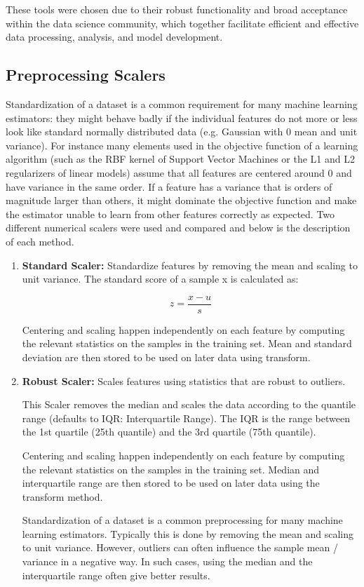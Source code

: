 \documentclass{article}
\theoremstyle{mytheoremstyle}
\theoremstyle{mytheoremstyle}
\theoremstyle{myproblemstyle}
\begin{document}
These tools were chosen due to their robust functionality and broad acceptance within the data science community, which together facilitate efficient and effective data processing, analysis, and model development.
\subsection{Preprocessing Scalers}

Standardization of a dataset is a common requirement for many machine learning estimators: they might behave badly if the individual features do not more or less look like standard normally distributed data (e.g. Gaussian with 0 mean and unit variance). For instance many elements used in the objective function of a learning algorithm (such as the RBF kernel of Support Vector Machines or the L1 and L2 regularizers of linear models) assume that all features are centered around 0 and have variance in the same order. If a feature has a variance that is orders of magnitude larger than others, it might dominate the objective function and make the estimator unable to learn from other features correctly as expected.
Two different numerical scalers were used and compared and below is the description of each method. 
\begin{enumerate}
    \item \textbf{Standard Scaler: } Standardize features by removing the mean and scaling to unit variance. The standard score of a sample x is calculated as:
    
    \[z = \frac{x-u}{s}\]
    
Centering and scaling happen independently on each feature by computing the relevant statistics on the samples in the training set. Mean and standard deviation are then stored to be used on later data using transform.


    \item \textbf{Robust Scaler: } Scales features using statistics that are robust to outliers.

    This Scaler removes the median and scales the data according to the quantile range (defaults to IQR: Interquartile Range). The IQR is the range between the 1st quartile (25th quantile) and the 3rd quartile (75th quantile).
    
    Centering and scaling happen independently on each feature by computing the relevant statistics on the samples in the training set. Median and interquartile range are then stored to be used on later data using the transform method.
    
    Standardization of a dataset is a common preprocessing for many machine learning estimators. Typically this is done by removing the mean and scaling to unit variance. However, outliers can often influence the sample mean / variance in a negative way. In such cases, using the median and the interquartile range often give better results.
\end{enumerate}
\end{document}
